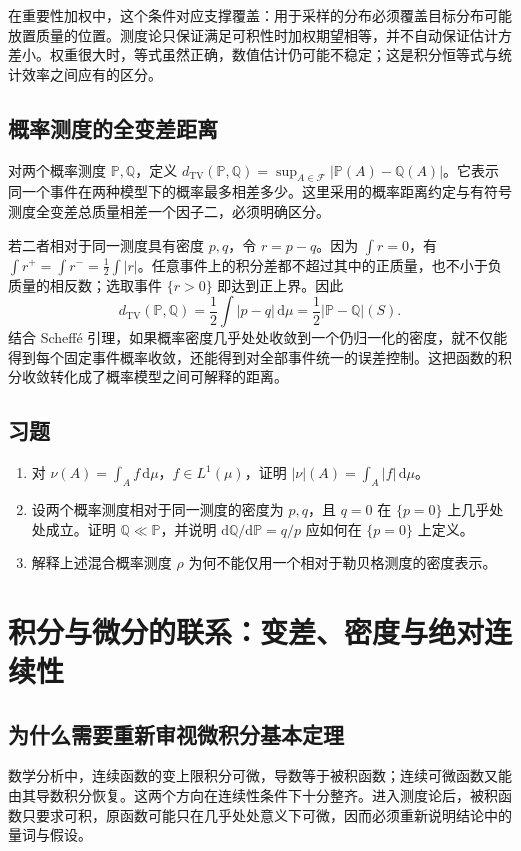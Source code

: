 \documentclass[UTF8,12pt,a4paper,fontset=fandol]{ctexbook}
\begin{document}
在重要性加权中，这个条件对应支撑覆盖：用于采样的分布必须覆盖目标分布可能放置质量的位置。测度论只保证满足可积性时加权期望相等，并不自动保证估计方差小。权重很大时，等式虽然正确，数值估计仍可能不稳定；这是积分恒等式与统计效率之间应有的区分。

\section{概率测度的全变差距离}
对两个概率测度 $\mathbb P,\mathbb Q$，定义
$d_{\mathrm{TV}}(\mathbb P,\mathbb Q)=\sup_{A\in\mathcal F}|\mathbb P(A)-\mathbb Q(A)|$。它表示同一个事件在两种模型下的概率最多相差多少。这里采用的概率距离约定与有符号测度全变差总质量相差一个因子二，必须明确区分。

若二者相对于同一测度具有密度 $p,q$，令 $r=p-q$。因为 $\int r=0$，有 $\int r^+=\int r^-=\tfrac12\int|r|$。任意事件上的积分差都不超过其中的正质量，也不小于负质量的相反数；选取事件 $\{r>0\}$ 即达到正上界。因此
\[
 d_{\mathrm{TV}}(\mathbb P,\mathbb Q)
 =\frac12\int|p-q|\,\mathrm d\mu
 =\frac12|\mathbb P-\mathbb Q|(S).
\]
结合 Scheffé 引理，如果概率密度几乎处处收敛到一个仍归一化的密度，就不仅能得到每个固定事件概率收敛，还能得到对全部事件统一的误差控制。这把函数的积分收敛转化成了概率模型之间可解释的距离。

\section{习题}
\begin{enumerate}
 \item 对 $\nu(A)=\int_Af\,\mathrm d\mu$，$f\in L^1(\mu)$，证明 $|\nu|(A)=\int_A|f|\,\mathrm d\mu$。
 \item 设两个概率测度相对于同一测度的密度为 $p,q$，且 $q=0$ 在 $\{p=0\}$ 上几乎处处成立。证明 $\mathbb Q\ll\mathbb P$，并说明 $\mathrm d\mathbb Q/\mathrm d\mathbb P=q/p$ 应如何在 $\{p=0\}$ 上定义。
 \item 解释上述混合概率测度 $\rho$ 为何不能仅用一个相对于勒贝格测度的密度表示。
\end{enumerate}

\chapter{积分与微分的联系：变差、密度与绝对连续性}
\label{chap:mt-calculus}

\section{为什么需要重新审视微积分基本定理}
数学分析中，连续函数的变上限积分可微，导数等于被积函数；连续可微函数又能由其导数积分恢复。这两个方向在连续性条件下十分整齐。进入测度论后，被积函数只要求可积，原函数可能只在几乎处处意义下可微，因而必须重新说明结论中的量词与假设。
\end{document}
